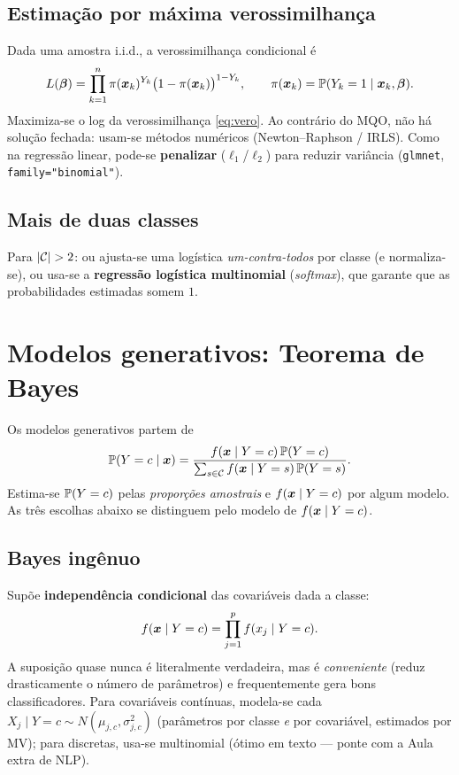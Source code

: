 \documentclass[11pt,a4paper]{article}
\begin{document}
\subsection{Estimação por máxima verossimilhança}
Dada uma amostra i.i.d., a verossimilhança condicional é
\begin{equation}\label{eq:vero}
  L(\bm{\beta}) = \prod_{k=1}^n \pi(\bm{x}_k)^{Y_k}\big(1-\pi(\bm{x}_k)\big)^{1-Y_k},
  \qquad \pi(\bm{x}_k)=\mathbb{P}(Y_k=1\mid\bm{x}_k,\bm{\beta}).
\end{equation}
Maximiza-se o log da verossimilhança \eqref{eq:vero}. Ao contrário do MQO, não há
solução fechada: usam-se métodos numéricos (Newton--Raphson / IRLS). Como na
regressão linear, pode-se \textbf{penalizar} ($\ell_1$/$\ell_2$) para reduzir
variância (\texttt{glmnet}, \texttt{family="binomial"}).

\subsection{Mais de duas classes}
Para $\left\lvert \mathcal{C} \right\rvert>2$: ou ajusta-se uma logística \emph{um-contra-todos} por
classe (e normaliza-se), ou usa-se a \textbf{regressão logística multinomial}
(\emph{softmax}), que garante que as probabilidades estimadas somem $1$.

\section{Modelos generativos: Teorema de Bayes}
Os modelos generativos partem de
\begin{equation}\label{eq:gen}
  \mathbb{P}(Y=c\mid\bm{x}) = \frac{f(\bm{x}\mid Y=c)\,\mathbb{P}(Y=c)}
                          {\sum_{s\in\mathcal{C}} f(\bm{x}\mid Y=s)\,\mathbb{P}(Y=s)}.
\end{equation}
Estima-se $\mathbb{P}(Y=c)$ pelas \emph{proporções amostrais} e $f(\bm{x}\mid Y=c)$ por
algum modelo. As três escolhas abaixo se distinguem pelo modelo de
$f(\bm{x}\mid Y=c)$.

\subsection{Bayes ingênuo}
Supõe \textbf{independência condicional} das covariáveis dada a classe:
\begin{equation}\label{eq:nb}
  f(\bm{x}\mid Y=c) = \prod_{j=1}^p f(x_j\mid Y=c).
\end{equation}
A suposição quase nunca é literalmente verdadeira, mas é \emph{conveniente} (reduz
drasticamente o número de parâmetros) e frequentemente gera bons classificadores.
Para covariáveis contínuas, modela-se cada
$X_j\mid Y=c \sim N(\mu_{j,c},\sigma^2_{j,c})$ (parâmetros por classe \emph{e}
por covariável, estimados por MV); para discretas, usa-se multinomial (ótimo em
texto --- ponte com a Aula extra de NLP).
\end{document}
